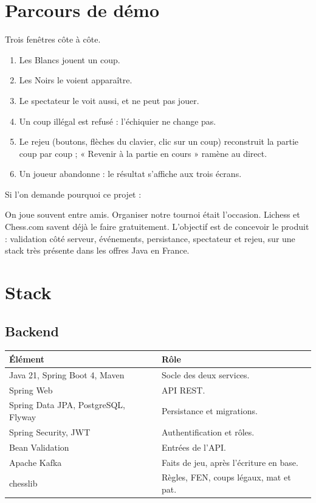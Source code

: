 \documentclass[11pt,a4paper]{article}
\newcommand{\panel}[2]{%
  \par\vspace{6pt}%
  {\setlength{\fboxsep}{9pt}%
   \noindent\colorbox{soft}{%
     \parbox{\dimexpr\linewidth-2\fboxsep\relax}{#1\small #2}%
   }}%
  \par\vspace{6pt}%
}
\newcommand{\quotebox}[1]{\panel{}{#1}}
\begin{document}
\section{Parcours de démo}

Trois fenêtres côte à côte.

\begin{enumerate}
  \item Les Blancs jouent un coup.
  \item Les Noirs le voient apparaître.
  \item Le spectateur le voit aussi, et ne peut pas jouer.
  \item Un coup illégal est refusé : l'échiquier ne change pas.
  \item Le rejeu (boutons, flèches du clavier, clic sur un coup) reconstruit la partie coup par coup ; « Revenir à la partie en cours » ramène au direct.
  \item Un joueur abandonne : le résultat s'affiche aux trois écrans.
\end{enumerate}

Si l'on demande pourquoi ce projet :

\quotebox{%
On joue souvent entre amis. Organiser notre tournoi était l'occasion. Lichess et Chess.com savent déjà le faire gratuitement. L'objectif est de concevoir le produit : validation côté serveur, événements, persistance, spectateur et rejeu, sur une stack très présente dans les offres Java en France.%
}

\section{Stack}

\subsection{Backend}
\begin{tabularx}{\linewidth}{@{}Y L@{}}
\toprule
Élément & Rôle \\
\midrule
Java 21, Spring Boot 4, Maven & Socle des deux services. \\
Spring Web & API REST. \\
Spring Data JPA, PostgreSQL, Flyway & Persistance et migrations. \\
Spring Security, JWT & Authentification et rôles. \\
Bean Validation & Entrées de l'API. \\
Apache Kafka & Faits de jeu, après l'écriture en base. \\
chesslib & Règles, FEN, coups légaux, mat et pat. \\
\bottomrule
\end{tabularx}
\end{document}
